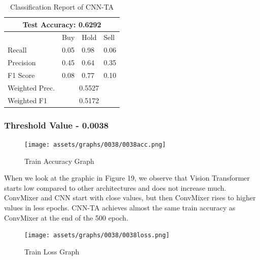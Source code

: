\documentclass[]{article}
\begin{document}
\begin{table}[H]
\centering
\caption{Classification Report of CNN-TA}
\begin{tabular}{|llll|}
\hline
\multicolumn{4}{|c|}{\textbf{Test Accuracy: 0.6292}}                                                         \\ \hline
\multicolumn{1}{|l|}{}               & \multicolumn{1}{l|}{Buy}  & \multicolumn{1}{l|}{Hold} & Sell \\ \hline
\multicolumn{1}{|l|}{Recall}         & \multicolumn{1}{l|}{0.05} & \multicolumn{1}{l|}{0.98} & 0.06 \\ \hline
\multicolumn{1}{|l|}{Precision}      & \multicolumn{1}{l|}{0.45} & \multicolumn{1}{l|}{0.64} & 0.35 \\ \hline
\multicolumn{1}{|l|}{F1 Score}       & \multicolumn{1}{l|}{0.08} & \multicolumn{1}{l|}{0.77} & 0.10 \\ \hline
\multicolumn{1}{|l|}{Weighted Prec.} & \multicolumn{3}{c|}{0.5527}                                  \\ \hline
\multicolumn{1}{|l|}{Weighted F1}    & \multicolumn{3}{c|}{0.5172}                                  \\ \hline
\end{tabular}
\end{table}
\noindent
\subsubsection{Threshold Value - 0.0038}
\begin{figure}[H]
    \begin{center}
        \texttt{[image: assets/graphs/0038/0038acc.png]}
        \caption{Train Accuracy Graph}
    \end{center}
\end{figure}
\noindent
When we look at the graphic in Figure 19, we observe that Vision Transformer starts low compared to other architectures and does not increase much. ConvMixer and CNN start with close values, but then ConvMixer rises to higher values in less epochs. CNN-TA achieves almost the same train accuracy as ConvMixer at the end of the 500 epoch.
\begin{figure}[H]
    \begin{center}
        \texttt{[image: assets/graphs/0038/0038loss.png]}
        \caption{Train Loss Graph}
    \end{center}
\end{figure}
\end{document}
